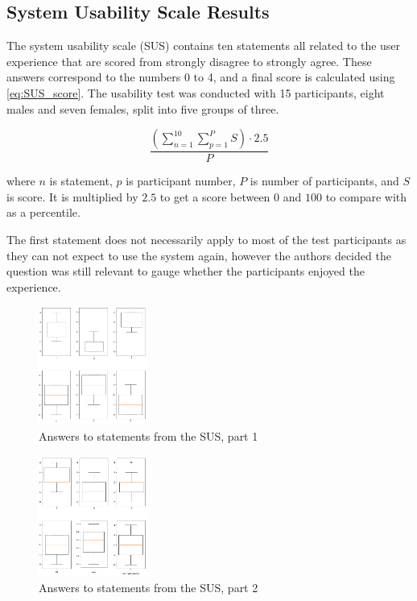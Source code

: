 \graphicspath{{fake_results/}}
\subsection{System Usability Scale Results}

The system usability scale (SUS) contains ten statements all related to the user experience that are scored from strongly disagree to strongly agree. These answers correspond to the numbers 0 to 4, and a final score is calculated using \autoref{eq:SUS_score}. The usability test was conducted with 15 participants, eight males and seven females, split into five groups of three.

\begin{equation}
	\frac{(\sum\limits_{n=1}^{10} \sum\limits_{p=1}^{P} S) \cdot 2.5 }{P}
	\label{eq:SUS_score}
\end{equation}

where $ n $ is statement, $ p $ is participant number, $ P $ is number of participants, and $ S $ is score. It is multiplied by $2.5$ to get a score between $ 0 $ and $ 100 $ to compare with as a percentile. %

The first statement does not necessarily apply to most of the test participants as they can not expect to use the system again, however the authors decided the question was still relevant to gauge whether the participants enjoyed the experience. 

\begin{figure}
\centering
\includegraphics[width=0.32\textwidth]{Page1.png}
\caption{Answers to statements from the SUS, part 1}
\label{fig:one}
\end{figure}

\begin{figure}
\centering
\includegraphics[width=0.32\textwidth]{Page2.png}
\caption{Answers to statements from the SUS, part 2}
\label{fig:two}
\end{figure}

